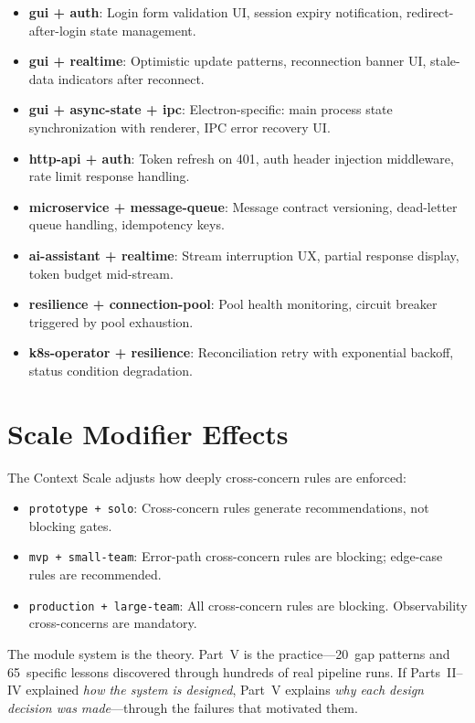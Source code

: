 \documentclass[11pt,a4paper,openright,twoside]{report}
\begin{document}
\begin{itemize}
  \item \textbf{gui + auth}: Login form validation UI, session expiry notification, redirect-after-login state management.
  \item \textbf{gui + realtime}: Optimistic update patterns, reconnection banner UI, stale-data indicators after reconnect.
  \item \textbf{gui + async-state + ipc}: Electron-specific: main process state synchronization with renderer, IPC error recovery UI.
  \item \textbf{http-api + auth}: Token refresh on 401, auth header injection middleware, rate limit response handling.
  \item \textbf{microservice + message-queue}: Message contract versioning, dead-letter queue handling, idempotency keys.
  \item \textbf{ai-assistant + realtime}: Stream interruption UX, partial response display, token budget mid-stream.
  \item \textbf{resilience + connection-pool}: Pool health monitoring, circuit breaker triggered by pool exhaustion.
  \item \textbf{k8s-operator + resilience}: Reconciliation retry with exponential backoff, status condition degradation.
\end{itemize}

\section{Scale Modifier Effects}

The Context Scale adjusts how deeply cross-concern rules are enforced:

\begin{itemize}
  \item \texttt{prototype + solo}: Cross-concern rules generate recommendations, not blocking gates.
  \item \texttt{mvp + small-team}: Error-path cross-concern rules are blocking; edge-case rules are recommended.
  \item \texttt{production + large-team}: All cross-concern rules are blocking. Observability cross-concerns are mandatory.
\end{itemize}

The module system is the theory. Part~V is the practice---20~gap patterns and 65~specific lessons discovered through hundreds of real pipeline runs. If Parts~II--IV explained \emph{how the system is designed}, Part~V explains \emph{why each design decision was made}---through the failures that motivated them.
\end{document}
